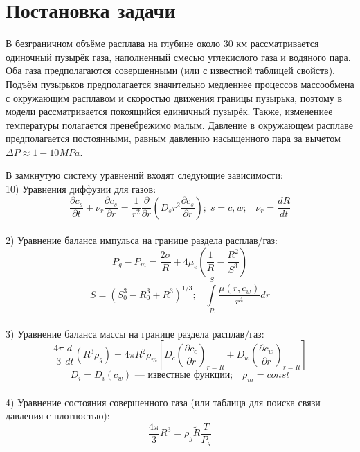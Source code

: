 \section{Постановка задачи}

\par В безграничном объёме расплава на глубине около 30 км рассматривается одиночный пузырёк газа, наполненный смесью углекислого газа и водяного пара. Оба газа предполагаются совершенными (или с известной таблицей свойств). Подъём пузырьков предполагается значительно медленнее процессов массообмена с окружающим расплавом и скоростью движения границы пузырька, поэтому в модели рассматривается покоящийся единичный пузырёк. Также, изменениее температуры полагается пренебрежимо малым. Давление в окружающем расплаве предполагается постоянными, равным давлению насыщенного пара за вычетом $\Delta P\approx 1-10 MPa$.\\
\par В замкнутую систему уравнений входят следующие зависимости:\\
10) Уравнения диффузии для газов:\\
$$\frac{\partial c_{s}}{\partial t}+\nu_{r} \frac{\partial c_{s}}{\partial r}=\frac{1}{r^{2}}\frac{\partial}{\partial r}(D_{s}r^{2}\frac{\partial c_{s}}{\partial r});\; s=c, w;\;\;\;\nu_{r}=\frac{dR}{dt}$$\\
2) Уравнение баланса импульса на границе раздела расплав/газ:\\
$$P_{g}-P_{m}=\frac{2 \sigma}{R}+4\mu_{e}(\frac{1}{R}-\frac{R^{2}}{S^{3}})$$
$$S = (S_{0}^{3}-R_{0}^{3}+R^{3})^{1/3};\;\;\;\int\limits^{S}_{R}\frac{\mu(r,c_{w})}{r^{4}}dr$$\\
3) Уравнение баланса массы на границе раздела расплав/газ:\\
$$\frac{4\pi}{3}\frac{d}{dt}(R^3\rho_{g})=4\pi R^{2}\rho_{m}[D_{c}(\frac{\partial c_{c}}{\partial r})_{r=R}+D_{w}(\frac{\partial c_{w}}{\partial r})_{r=R}]$$
$$D_{i}=D_{i}(c_{w})\text{ --- известные функции};\;\;\;\rho_{m}=const$$\\
4) Уравнение состояния совершенного газа (или таблица для поиска связи давления с плотностью):\\
$$\frac{4\pi}{3}R^{3}=\rho_{g} \tilde{R}\frac{T}{P_{g}}$$